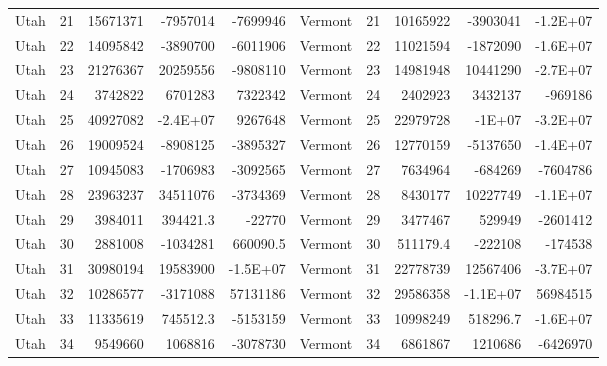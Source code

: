 \begin{landscape}
\begin{singlespace}
\begin{longtable}{lrrrr|lrrrr}
		Utah &  21 & 15671371 & -7957014 & -7699946 & Vermont &  21 & 10165922 & -3903041 & -1.2E+07 \\
		Utah &  22 & 14095842 & -3890700 & -6011906 & Vermont &  22 & 11021594 & -1872090 & -1.6E+07 \\
		Utah &  23 & 21276367 & 20259556 & -9808110 & Vermont &  23 & 14981948 & 10441290 & -2.7E+07 \\
		Utah &  24 & 3742822 & 6701283 & 7322342 & Vermont &  24 & 2402923 & 3432137 & -969186 \\
		Utah &  25 & 40927082 & -2.4E+07 & 9267648 & Vermont &  25 & 22979728 & -1E+07 & -3.2E+07 \\
		Utah &  26 & 19009524 & -8908125 & -3895327 & Vermont &  26 & 12770159 & -5137650 & -1.4E+07 \\
		Utah &  27 & 10945083 & -1706983 & -3092565 & Vermont &  27 & 7634964 & -684269 & -7604786 \\
		Utah &  28 & 23963237 & 34511076 & -3734369 & Vermont &  28 & 8430177 & 10227749 & -1.1E+07 \\
		Utah &  29 & 3984011 & 394421.3 & -22770 & Vermont &  29 & 3477467 & 529949 & -2601412 \\
		Utah &  30 & 2881008 & -1034281 & 660090.5 & Vermont &  30 & 511179.4 & -222108 & -174538 \\
		Utah &  31 & 30980194 & 19583900 & -1.5E+07 & Vermont &  31 & 22778739 & 12567406 & -3.7E+07 \\
		Utah &  32 & 10286577 & -3171088 & 57131186 & Vermont &  32 & 29586358 & -1.1E+07 & 56984515 \\
		Utah &  33 & 11335619 & 745512.3 & -5153159 & Vermont &  33 & 10998249 & 518296.7 & -1.6E+07 \\
		Utah &  34 & 9549660 & 1068816 & -3078730 & Vermont &  34 & 6861867 & 1210686 & -6426970\\



\end{longtable}
\end{singlespace}
\end{landscape}

